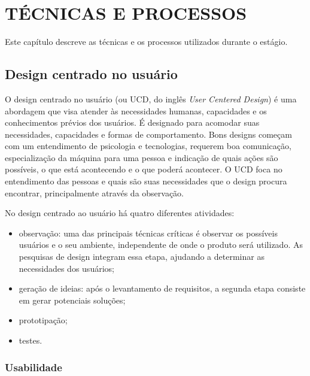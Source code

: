 \chapter{TÉCNICAS E PROCESSOS}

Este capítulo descreve as técnicas e os processos utilizados durante o estágio.



\section{Design centrado no usuário}
O design centrado no usuário (ou UCD, do inglês \textit{User Centered Design}) é uma abordagem que visa atender às necessidades humanas, capacidades e os conhecimentos prévios dos usuários. É designado para acomodar suas necessidades, capacidades e formas de comportamento. Bons designs começam com um entendimento de psicologia e tecnologias, requerem boa comunicação, especialização da máquina para uma pessoa e indicação de quais ações são possíveis, o que está acontecendo e o que poderá acontecer. O UCD foca no entendimento das pessoas e quais são suas necessidades que o design procura encontrar, principalmente através da observação.~\cite{Norman:2002:DET:2187809} 

No design centrado ao usuário há quatro diferentes atividades:

\begin{itemize}

\item observação: uma das principais técnicas críticas é observar os possíveis usuários e o seu ambiente, independente de onde o produto será utilizado. As pesquisas de design integram essa etapa, ajudando a determinar as necessidades dos usuários;

\item geração de ideias: após o levantamento de requisitos, a segunda etapa consiste em gerar potenciais soluções;

\item prototipação;

\item testes.

\end{itemize}

\subsection{Usabilidade}

